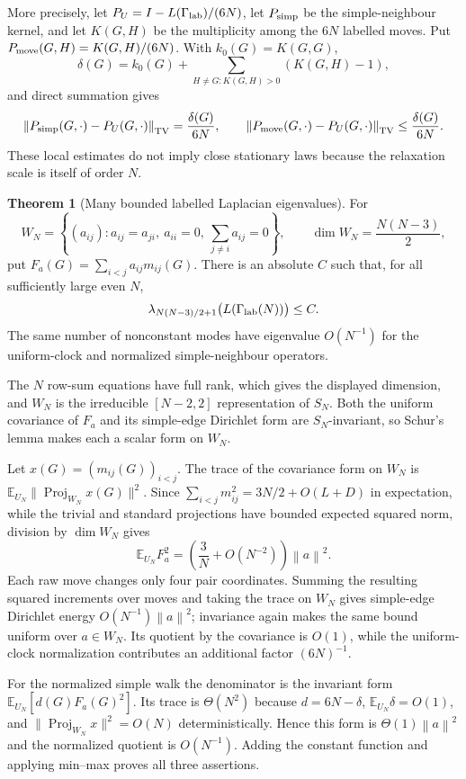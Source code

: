 \documentclass[11pt]{article}
\makeatletter
\newcommand{\E}{\mathbb E}
\newcommand{\norm}[1]{\left\|#1\right\|}
\theoremstyle{definition}
\newtheorem{theorem}{Theorem}
\renewenvironment{proof}[1][\proofname]{\par
  \pushQED{\qed}%
  \normalfont \topsep6\p@\@plus6\p@\relax
  \trivlist
  \item[\hskip\labelsep\bfseries #1\@addpunct{.}]\ignorespaces
}{%
  \popQED\endtrivlist\@endpefalse
}
\makeatother
\begin{document}
More precisely, let $P_U=I-L(\Gamma_{\rm lab})/(6N)$, let $P_{\rm simp}$ be
the simple-neighbour kernel, and let $K(G,H)$ be the multiplicity among the
$6N$ labelled moves.  Put $P_{\rm move}(G,H)=K(G,H)/(6N)$.  With
$k_0(G)=K(G,G)$,
\[
 \delta(G)=k_0(G)+\sum_{H\ne G:K(G,H)>0}(K(G,H)-1),
\]
and direct summation gives
\[
 \norm{P_{\rm simp}(G,\cdot)-P_U(G,\cdot)}_{\rm TV}
   =\frac{\delta(G)}{6N},\qquad
 \norm{P_{\rm move}(G,\cdot)-P_U(G,\cdot)}_{\rm TV}
   \le\frac{\delta(G)}{6N}.
\]
These local estimates do not imply close stationary laws because the
relaxation scale is itself of order $N$.

\begin{theorem}[Many bounded labelled Laplacian eigenvalues]
For
\[
 W_N=\left\{(a_{ij}):a_{ij}=a_{ji},\ a_{ii}=0,\
                 \sum_{j\ne i}a_{ij}=0\right\},
 \qquad \dim W_N=\frac{N(N-3)}2,
\]
put $F_a(G)=\sum_{i<j}a_{ij}m_{ij}(G)$.  There is an absolute $C$ such that,
for all sufficiently large even $N$,
\[
 \lambda_{N(N-3)/2+1}\bigl(L(\Gamma_{\rm lab}(N))\bigr)\le C.
\]
The same number of nonconstant modes have eigenvalue $O(N^{-1})$ for the
uniform-clock and normalized simple-neighbour operators.
\end{theorem}

\begin{proof}
The $N$ row-sum equations have full rank, which gives the displayed dimension,
and $W_N$ is the irreducible $[N-2,2]$ representation of $S_N$.  Both the
uniform covariance of $F_a$ and its simple-edge Dirichlet form are
$S_N$-invariant, so Schur's lemma makes each a scalar form on $W_N$.

Let $x(G)=(m_{ij}(G))_{i<j}$.  The trace of the covariance form on $W_N$ is
$\E_{U_N}\|\operatorname{Proj}_{W_N}x(G)\|^2$.  Since
$\sum_{i<j}m_{ij}^2=3N/2+O(L+D)$ in expectation, while the trivial and
standard projections have bounded expected squared norm, division by
$\dim W_N$ gives
\[
 \E_{U_N}F_a^2=\left(\frac3N+O(N^{-2})\right)\norm{a}^2.
\]
Each raw move changes only four pair coordinates.  Summing the resulting
squared increments over moves and taking the trace on $W_N$ gives simple-edge
Dirichlet energy $O(N^{-1})\norm{a}^2$; invariance again makes the same bound
uniform over $a\in W_N$.  Its quotient by the covariance is $O(1)$, while the
uniform-clock normalization contributes an additional factor $(6N)^{-1}$.

For the normalized simple walk the denominator is the invariant form
$\E_{U_N}[d(G)F_a(G)^2]$.  Its trace is $\Theta(N^2)$ because
$d=6N-\delta$, $\E_{U_N}\delta=O(1)$, and
$\|\operatorname{Proj}_{W_N}x\|^2=O(N)$ deterministically.  Hence this form is
$\Theta(1)\norm{a}^2$ and the normalized quotient is $O(N^{-1})$.  Adding the
constant function and applying min--max proves all three assertions.
\end{proof}
\end{document}
